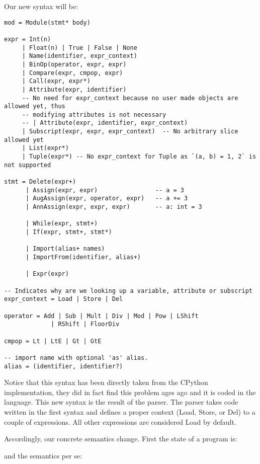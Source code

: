 Our new syntax will be:

\begin{verbatim}
mod = Module(stmt* body)

expr = Int(n)
     | Float(n) | True | False | None
     | Name(identifier, expr_context)
     | BinOp(operator, expr, expr)
     | Compare(expr, cmpop, expr)
     | Call(expr, expr*)
     | Attribute(expr, identifier)
     -- No need for expr_context because no user made objects are allowed yet, thus
     -- modifying attributes is not necessary
     -- | Attribute(expr, identifier, expr_context)
     | Subscript(expr, expr, expr_context)  -- No arbitrary slice allowed yet
     | List(expr*)
     | Tuple(expr*) -- No expr_context for Tuple as `(a, b) = 1, 2` is not supported

stmt = Delete(expr+)
      | Assign(expr, expr)                -- a = 3
      | AugAssign(expr, operator, expr)   -- a += 3
      | AnnAssign(expr, expr, expr)       -- a: int = 3

      | While(expr, stmt+)
      | If(expr, stmt+, stmt*)

      | Import(alias+ names)
      | ImportFrom(identifier, alias+)

      | Expr(expr)

-- Indicates why are we looking up a variable, attribute or subscript
expr_context = Load | Store | Del

operator = Add | Sub | Mult | Div | Mod | Pow | LShift
             | RShift | FloorDiv

cmpop = Lt | LtE | Gt | GtE

-- import name with optional 'as' alias.
alias = (identifier, identifier?)
\end{verbatim}

Notice that this syntax has been directly taken from the CPython implementation, they did in fact find this problem ages ago and it is coded in the language. This
new syntax is the result of the parser. The parser takes code written in the first syntax
and defines a proper context (Load, Store, or Del) to a couple of expressions. All other
expressions are considered Load by default.

Accordingly, our concrete semantics change. First the state of a program is:


and the semantics per se:



